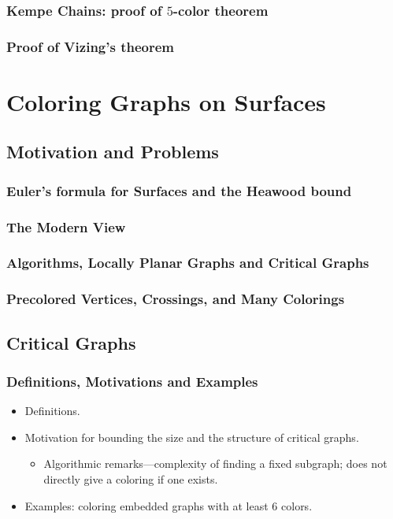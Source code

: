 \documentclass[12pt,twoside,openright,a4paper]{book}
\begin{document}
\section{Kempe Chains: proof of $5$-color theorem}

\section{Proof of Vizing's theorem}

\part{Coloring Graphs on Surfaces}

\chapter{Motivation and Problems}


\section{Euler's formula for Surfaces and the Heawood bound}

\section{The Modern View}

\section{Algorithms, Locally Planar Graphs and Critical Graphs}

\section{Precolored Vertices, Crossings, and Many Colorings}

\chapter{Critical Graphs}


\section{Definitions, Motivations and Examples}

\begin{itemize}
\item Definitions.
\item Motivation for bounding the size and the structure of critical graphs.
\begin{itemize}
\item Algorithmic remarks---complexity of finding a fixed subgraph; does not directly
give a coloring if one exists.
\end{itemize}
\item Examples: coloring embedded graphs with at least $6$ colors.
\end{itemize}
\end{document}
